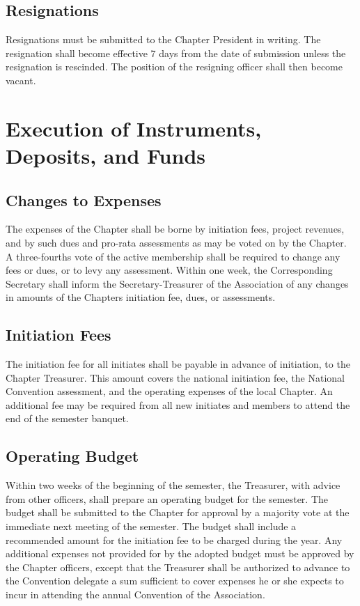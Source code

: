 \documentclass{article}
\begin{document}
	\subsection{Resignations}
	Resignations must be submitted to the Chapter President in writing. The resignation shall become effective 7 days from the date of submission unless the resignation is rescinded. The position of the resigning officer shall then become vacant.
	
	\section{Execution of Instruments, Deposits, and Funds}
	\subsection{Changes to Expenses}
	The expenses of the Chapter shall be borne by initiation fees, project revenues, and by such dues and pro-rata assessments as may be voted on by the Chapter. A three-fourths vote of the active membership shall be required to change any fees or dues, or to levy any assessment. Within one week, the Corresponding Secretary shall inform the Secretary-Treasurer of the Association of any changes in amounts of the Chapter\textquotesingle s initiation fee, dues, or assessments.
	\subsection{Initiation Fees}
	The initiation fee for all initiates shall be payable in advance of initiation, to the Chapter Treasurer. This amount covers the national initiation fee, the National Convention assessment, and the operating expenses of the local Chapter. An additional fee may be required from all new initiates and members to attend the end of the semester banquet.
	\subsection{Operating Budget}
	Within two weeks of the beginning of the semester, the Treasurer, with advice from other officers, shall prepare an operating budget for the semester. The budget shall be submitted to the Chapter for approval by a majority vote at the immediate next meeting of the semester. The budget shall include a recommended amount for the initiation fee to be charged during the year. Any additional expenses not provided for by the adopted budget must be approved by the Chapter officers, except that the Treasurer shall be authorized to advance to the Convention delegate a sum sufficient to cover expenses he or she expects to incur in attending the annual Convention of the Association.
\end{document}
